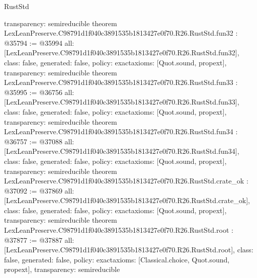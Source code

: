\begin{lexlean}{RustStd}
\begin{coremodule}
{  transparency: semireducible
}
theorem LexLeanPreserve.C98791d1f040c3891535b1813427e0f70.R26.RustStd.fun32 : @35794 := @35994 {
  all: [LexLeanPreserve.C98791d1f040c3891535b1813427e0f70.R26.RustStd.fun32],
  class: false,
  generated: false,
  policy: exact{axioms: [Quot.sound, propext]},
  transparency: semireducible
}
theorem LexLeanPreserve.C98791d1f040c3891535b1813427e0f70.R26.RustStd.fun33 : @35995 := @36756 {
  all: [LexLeanPreserve.C98791d1f040c3891535b1813427e0f70.R26.RustStd.fun33],
  class: false,
  generated: false,
  policy: exact{axioms: [Quot.sound, propext]},
  transparency: semireducible
}
theorem LexLeanPreserve.C98791d1f040c3891535b1813427e0f70.R26.RustStd.fun34 : @36757 := @37088 {
  all: [LexLeanPreserve.C98791d1f040c3891535b1813427e0f70.R26.RustStd.fun34],
  class: false,
  generated: false,
  policy: exact{axioms: [Quot.sound, propext]},
  transparency: semireducible
}
theorem LexLeanPreserve.C98791d1f040c3891535b1813427e0f70.R26.RustStd.crate_ok : @37092 := @37869 {
  all: [LexLeanPreserve.C98791d1f040c3891535b1813427e0f70.R26.RustStd.crate_ok],
  class: false,
  generated: false,
  policy: exact{axioms: [Quot.sound, propext]},
  transparency: semireducible
}
theorem LexLeanPreserve.C98791d1f040c3891535b1813427e0f70.R26.RustStd.root : @37877 := @37887 {
  all: [LexLeanPreserve.C98791d1f040c3891535b1813427e0f70.R26.RustStd.root],
  class: false,
  generated: false,
  policy: exact{axioms: [Classical.choice, Quot.sound, propext]},
  transparency: semireducible
}


\end{coremodule}
\end{lexlean}

